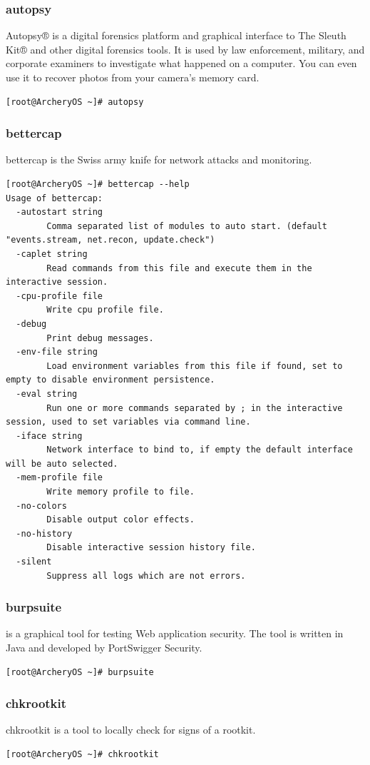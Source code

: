 \documentclass{article}
\begin{document}
\subsubsection{autopsy}
Autopsy® is a digital forensics platform and graphical interface to The Sleuth Kit® and other digital forensics tools. It is used by law enforcement, military, and corporate examiners to investigate what happened on a computer. You can even use it to recover photos from your camera's memory card.
\begin{lstlisting}
[root@ArcheryOS ~]# autopsy
\end{lstlisting}

\subsubsection{bettercap}
bettercap is the Swiss army knife for network attacks and monitoring.
\begin{lstlisting}
[root@ArcheryOS ~]# bettercap --help
Usage of bettercap:
  -autostart string
    	Comma separated list of modules to auto start. (default "events.stream, net.recon, update.check")
  -caplet string
    	Read commands from this file and execute them in the interactive session.
  -cpu-profile file
    	Write cpu profile file.
  -debug
    	Print debug messages.
  -env-file string
    	Load environment variables from this file if found, set to empty to disable environment persistence.
  -eval string
    	Run one or more commands separated by ; in the interactive session, used to set variables via command line.
  -iface string
    	Network interface to bind to, if empty the default interface will be auto selected.
  -mem-profile file
    	Write memory profile to file.
  -no-colors
    	Disable output color effects.
  -no-history
    	Disable interactive session history file.
  -silent
    	Suppress all logs which are not errors.
\end{lstlisting}

\subsubsection{burpsuite}
is a graphical tool for testing Web application security. The tool is written in Java and developed by PortSwigger Security.
\begin{lstlisting}
[root@ArcheryOS ~]# burpsuite
\end{lstlisting}

\subsubsection{chkrootkit}
chkrootkit is a tool to locally check for signs of a rootkit.
\begin{lstlisting}
[root@ArcheryOS ~]# chkrootkit
\end{lstlisting}
\end{document}
